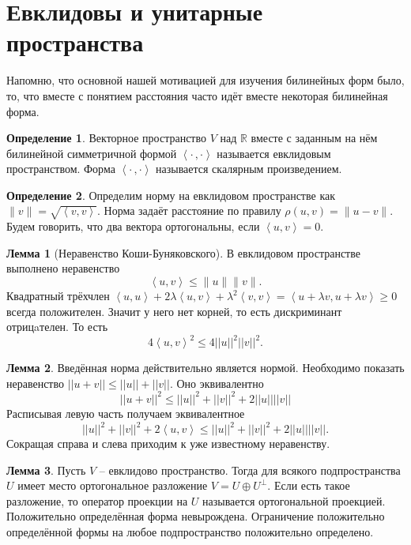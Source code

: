 \documentclass[10pt,a4paper,oneside]{book} %
\theoremstyle{definition}
\newtheorem*{rem}{Замечание}
\newtheorem*{defn}{Определение}
\newtheorem{lem}{Лемма}
\newcommand{\mb}[1]{\mathbb{#1}}
\newcommand{\ovl}{\overline}
\def\lan{\left\langle }
\def\ran{\right\rangle}
\def\dfn{\begin{defn}}
\def\edfn{\end{defn}}
\def\lm{\begin{lem}}
\def\elm{\end{lem}}
\def\rm{\begin{rem}}
\def\erm{\end{rem}}
\begin{document}
\begin{comment}
\lm Если форма $h$ невырождена, то размерность $\dim U^{\bot}= n - \dim U
$
\elm

\dfn Полуторалинейная форма $h$ называется эрмитовой, если $h(u,v)=\ovl{h(v,u)}$ и косоэрмитовой, если $h(u,v)=-\ovl{h(v,u)}$.
\edfn

\rm Полуторалинейная форма над $\mb C$ эрмитова тогда и только тогда, когда её матрица $A$ в некотором базисе удовлетворяет соотношению $\ovl{A^{\top}}=A$. В случае тождественного автоморфизма эрмитовость эквивалентна симметричности.
\erm
\end{comment}




\section{Евклидовы и унитарные пространства}

Напомню, что основной нашей мотивацией для изучения билинейных форм было, то, что вместе с понятием расстояния часто идёт вместе некоторая билинейная форма.





\dfn Векторное пространство $V$ над $\mb R$ вместе с заданным на нём билинейной симметричной формой $\lan\cdot \, , \cdot \ran$ называется евклидовым пространством. Форма $\lan\cdot \, , \cdot \ran$ называется скалярным произведением. 
\edfn

\dfn Определим  норму на евклидовом пространстве как $\|v\|=\sqrt{\lan v , v\ran }$. Норма задаёт расстояние по правилу $\rho(u,v)=\|u-v\|$. Будем говорить, что два вектора ортогональны, если $\lan u,v \ran =0$.
\edfn

\lm[Неравенство Коши-Буняковского] В евклидовом пространстве выполнено неравенство
$$ \lan u,v\ran \leq \|u\|\|v\|.$$
\proof  Квадратный трёхчлен $\lan u,u\ran +2\lambda\lan u,v\ran +\lambda^2\lan v,v\ran=\lan u+\lambda v, u+\lambda v\ran \geq 0$ всегда положителен. Значит у него нет корней, то есть дискриминант отрицaтелен. То есть $$4\lan u,v\ran^2 \leq 4 ||u||^2||v||^2.$$
\endproof
\elm

\lm Введённая норма действительно является нормой.
\proof Необходимо показать неравенство $||u+v||\leq ||u||+||v||$. Оно эквивалентно $$||u+v||^2 \leq ||u||^2+||v||^2+2||u||||v||$$
Расписывая левую часть получаем эквивалентное
$$ ||u||^2+||v||^2+2\lan u,v\ran \leq ||u||^2+||v||^2+2||u||||v||.$$
Сокращая справа и слева приходим к уже известному неравенству.
\endproof
\elm

 
\lm Пусть $V$ -- евклидово пространство. Тогда для всякого подпространства $U$ имеет место ортогональное разложение $V=U\oplus U^{\bot}$. Если есть такое разложение, то оператор проекции на $U$ называется ортогональной проекцией.
\proof Положительно определённая форма невырождена. Ограничение положительно определённой формы на любое подпространство положительно определено.
\endproof
\elm
\end{document}
